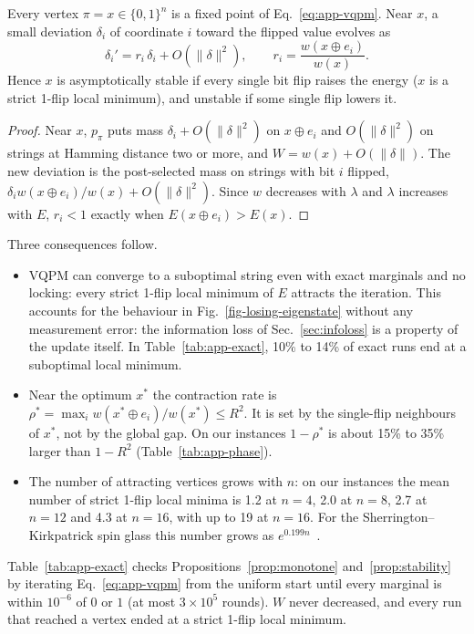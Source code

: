 \begin{proposition}
\label{prop:stability}
Every vertex $\pi=x\in\{0,1\}^n$ is a fixed point of Eq.~\eqref{eq:app-vqpm}. Near $x$, a small deviation $\delta_i$ of coordinate $i$ toward the flipped value evolves as
\begin{equation}
\delta_i'=r_i\,\delta_i+O(\|\delta\|^2),\qquad r_i=\frac{w(x\oplus e_i)}{w(x)} .
\end{equation}
Hence $x$ is asymptotically stable if every single bit flip raises the energy ($x$ is a strict 1-flip local minimum), and unstable if some single flip lowers it.
\end{proposition}
\begin{proof}
Near $x$, $p_\pi$ puts mass $\delta_i+O(\|\delta\|^2)$ on $x\oplus e_i$ and $O(\|\delta\|^2)$ on strings at Hamming distance two or more, and $W=w(x)+O(\|\delta\|)$. The new deviation is the post-selected mass on strings with bit $i$ flipped, $\delta_iw(x\oplus e_i)/w(x)+O(\|\delta\|^2)$. Since $w$ decreases with $\lambda$ and $\lambda$ increases with $E$, $r_i<1$ exactly when $E(x\oplus e_i)>E(x)$.
\end{proof}

Three consequences follow.
\begin{itemize}
\item[(a)] VQPM can converge to a suboptimal string even with exact marginals and no locking: every strict 1-flip local minimum of $E$ attracts the iteration. This accounts for the behaviour in Fig.~\ref{fig-losing-eigenstate} without any measurement error: the information loss of Sec.~\ref{sec:infoloss} is a property of the update itself. In Table~\ref{tab:app-exact}, 10\% to 14\% of exact runs end at a suboptimal local minimum.
\item[(b)] Near the optimum $x^*$ the contraction rate is $\rho^*=\max_iw(x^*\oplus e_i)/w(x^*)\le R^2$. It is set by the single-flip neighbours of $x^*$, not by the global gap. On our instances $1-\rho^*$ is about 15\% to 35\% larger than $1-R^2$ (Table~\ref{tab:app-phase}).
\item[(c)] The number of attracting vertices grows with $n$: on our instances the mean number of strict 1-flip local minima is 1.2 at $n=4$, 2.0 at $n=8$, 2.7 at $n=12$ and 4.3 at $n=16$, with up to 19 at $n=16$. For the Sherrington--Kirkpatrick spin glass this number grows as $e^{0.199n}$~\cite{tanaka1980analytic}.
\end{itemize}

Table~\ref{tab:app-exact} checks Propositions~\ref{prop:monotone} and~\ref{prop:stability} by iterating Eq.~\eqref{eq:app-vqpm} from the uniform start until every marginal is within $10^{-6}$ of $0$ or $1$ (at most $3\times10^5$ rounds). $W$ never decreased, and every run that reached a vertex ended at a strict 1-flip local minimum.

